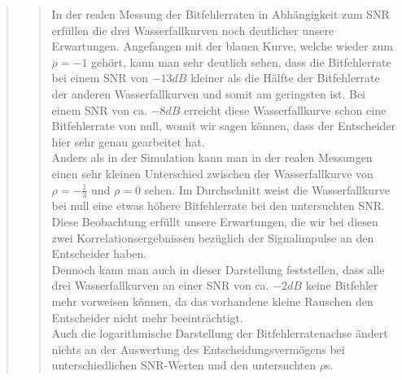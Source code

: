 \begin{quote}
\begin{quote}
                \vspace{2em}
        
        In der realen Messung der Bitfehlerraten in Abhängigkeit zum SNR
        erfüllen die drei Wasserfallkurven noch deutlicher unsere Erwartungen.
        Angefangen mit der blauen Kurve, welche wieder zum $\rho = -1$ gehört,
        kann man sehr deutlich sehen, dass die Bitfehlerrate bei einem
        SNR von $-13 dB$ kleiner als die Hälfte der Bitfehlerrate der anderen
        Wasserfallkurven und somit am geringsten ist. Bei einem SNR von ca. $-8
        dB$ erreicht diese Wasserfallkurve schon eine Bitfehlerrate von null,
        womit wir sagen können, dass der Entscheider hier sehr genau gearbeitet
        hat.\\ 
        Anders als in der Simulation kann man in der realen Messungen einen sehr
        kleinen Unterschied zwischen der Wasserfallkurve von $\rho =
        -\frac{1}{3}$ und $\rho = 0$ sehen. Im Durchschnitt weist die
        Wasserfallkurve bei null eine etwas höhere Bitfehlerrate bei den
        untersuchten SNR. Diese Beobachtung erfüllt unsere Erwartungen, die wir
        bei diesen zwei Korrelationsergebnissen bezüglich der Signalimpulse an den 
        Entscheider haben.\\
        
        Dennoch kann man auch in dieser Darstellung feststellen, dass alle drei
        Wasserfallkurven an einer SNR von ca. $-2 dB$ keine Bitfehler mehr
        vorweisen können, da das vorhandene kleine Rauschen den Entscheider
        nicht mehr beeinträchtigt.\\
        
        Auch die logarithmische Darstellung der Bitfehlerratenachse ändert
        nichts an der Auswertung des Entscheidungsvermögens bei
        unterschiedlichen SNR-Werten und den untersuchten $\rho$s.
        
        
        
    \end{quote}  %
            
\end{quote}%

    
